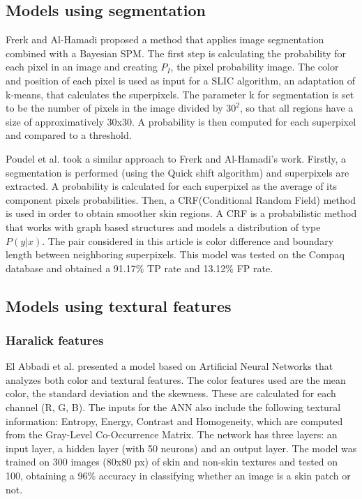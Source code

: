 \documentclass[12pt]{report}
\begin{document}
 	\subsection{Models using segmentation}
 	Frerk and Al-Hamadi\cite{superpixels_applied_1} proposed a method that applies image segmentation combined with a Bayesian SPM. The first step is calculating the probability for each pixel in an image and creating \(P_I\), the pixel probability image. The color and position of each pixel is used as input for a SLIC algorithm, an adaptation of k-means, that calculates the superpixels. The parameter k for segmentation is set to be the number of pixels in the image divided by \(30^2\), so that all regions have a size of approximatively 30x30. A probability is then computed for each superpixel and compared to a threshold.
 	
 	Poudel et al.\cite{superpixels_applied_2} took a similar approach to Frerk and Al-Hamadi's\cite{superpixels_applied_1} work. Firstly, a segmentation is performed (using the Quick shift algorithm) and superpixels are extracted. A probability is calculated for each superpixel as the average of its component pixels probabilities. Then, a CRF(Conditional Random Field) method is used in order to obtain smoother skin regions. A CRF is a probabilistic method that works with graph based structures and models a distribution of type $P(y|x)$. The pair considered in this article is color difference and boundary length between neighboring superpixels. This model was tested on the Compaq database and obtained a 91.17\% TP rate and 13.12\% FP rate.
 	
 	\subsection{Models using textural features}
 	
 	\subsubsection{Haralick features}
 	El Abbadi et al.\cite{color_texture_ann} presented a model based on Artificial Neural Networks that analyzes both color and textural features. The color features used are the mean color, the standard deviation and the skewness. These are calculated for each channel (R, G, B). The inputs for the ANN also include the following textural information: Entropy, Energy, Contrast and Homogeneity, which are computed from the Gray-Level Co-Occurrence Matrix. The network has three layers: an input layer, a hidden layer (with 50 neurons) and an output layer. The model was trained on 300 images (80x80 px) of skin and non-skin textures and tested on 100, obtaining a 96\% accuracy in classifying whether an image is a skin patch or not.
 	
\end{document}
